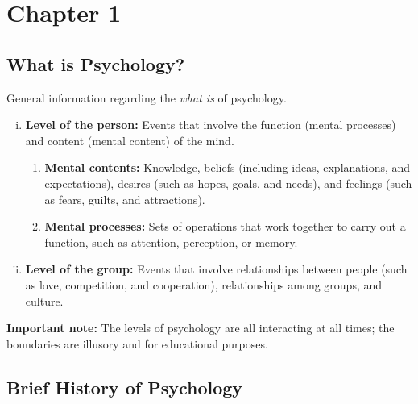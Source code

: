 \documentclass{article}
\begin{document}

\section{Chapter 1}

\subsection{What is Psychology?}
General information regarding the \textit{what is} of psychology.
\begin{enumerate}[i.]
  \item \textbf{Level of the person:} Events that involve the function (mental processes) and content (mental content) of the mind. 
    
    \begin{enumerate}

    \item \textbf{Mental contents:} Knowledge, beliefs (including ideas, explanations, and expectations), desires (such as hopes, goals, and needs), and feelings (such as fears, guilts, and attractions).
      
      \item \textbf{Mental processes:} Sets of operations that work together to carry out a function, such as attention, perception, or memory. 

    \end{enumerate}
        
        \item \textbf{Level of the group:} Events that involve relationships between people (such as love, competition, and cooperation), relationships among groups, and culture.
\end{enumerate}

\begin{tcolorbox}
  \textbf{Important note:} The levels of psychology are all interacting at all times; the boundaries are illusory and for educational purposes.
\end{tcolorbox}

\subsection{Brief History of Psychology}
\end{document}
